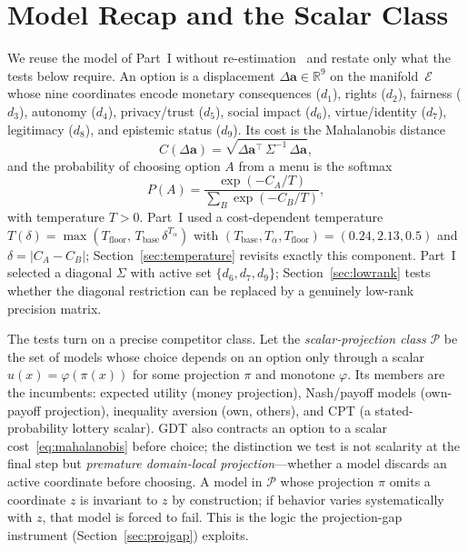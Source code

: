 \documentclass[journal]{IEEEtran}
\newcommand{\E}{\mathcal{E}}               %
\newcommand{\Pclass}{\mathcal{P}}          %
\begin{document}
\section{Model Recap and the Scalar Class}
\label{sec:recap}

We reuse the model of Part~I without re-estimation~\cite{bond2026partI} and restate only what the tests below require.
An option is a displacement $\Delta\mathbf{a}\in\mathbb{R}^9$ on the manifold~$\E$ whose nine coordinates encode monetary consequences ($d_1$), rights ($d_2$), fairness ($d_3$), autonomy ($d_4$), privacy/trust ($d_5$), social impact ($d_6$), virtue/identity ($d_7$), legitimacy ($d_8$), and epistemic status ($d_9$).
Its cost is the Mahalanobis distance
\begin{equation}
    C(\Delta\mathbf{a}) = \sqrt{\Delta\mathbf{a}^{\top}\, \Sigma^{-1}\, \Delta\mathbf{a}},
    \label{eq:mahalanobis}
\end{equation}
and the probability of choosing option $A$ from a menu is the softmax
\begin{equation}
    P(A) = \frac{\exp(-C_A/T)}{\sum_{B}\exp(-C_B/T)},
    \label{eq:softmax}
\end{equation}
with temperature $T>0$.
Part~I used a cost-dependent temperature $T(\delta)=\max(T_{\text{floor}},\,T_{\text{base}}\,\delta^{T_\alpha})$ with $(T_{\text{base}},T_\alpha,T_{\text{floor}})=(0.24,2.13,0.5)$ and $\delta=|C_A-C_B|$; Section~\ref{sec:temperature} revisits exactly this component.
Part~I selected a diagonal $\Sigma$ with active set $\{d_6,d_7,d_9\}$; Section~\ref{sec:lowrank} tests whether the diagonal restriction can be replaced by a genuinely low-rank precision matrix.

The tests turn on a precise competitor class.
Let the \emph{scalar-projection class} $\Pclass$ be the set of models whose choice depends on an option only through a scalar $u(x)=\varphi(\pi(x))$ for some projection $\pi$ and monotone $\varphi$.
Its members are the incumbents: expected utility (money projection), Nash/payoff models (own-payoff projection), inequality aversion (own, others), and CPT (a stated-probability lottery scalar).
GDT also contracts an option to a scalar cost~\eqref{eq:mahalanobis} before choice; the distinction we test is not scalarity at the final step but \emph{premature domain-local projection}---whether a model discards an active coordinate before choosing.
A model in $\Pclass$ whose projection $\pi$ omits a coordinate $z$ is invariant to $z$ by construction; if behavior varies systematically with $z$, that model is forced to fail.
This is the logic the projection-gap instrument (Section~\ref{sec:projgap}) exploits.
\end{document}
